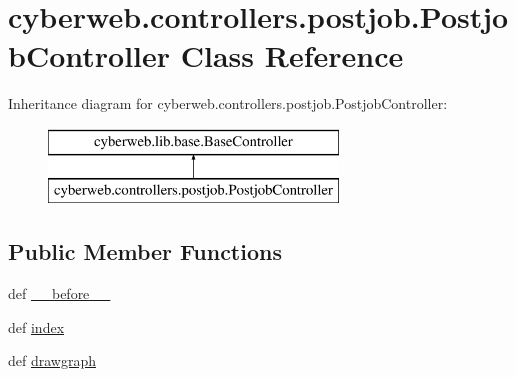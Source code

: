 \hypertarget{classcyberweb_1_1controllers_1_1postjob_1_1_postjob_controller}{\section{cyberweb.\-controllers.\-postjob.\-Postjob\-Controller \-Class \-Reference}
\label{classcyberweb_1_1controllers_1_1postjob_1_1_postjob_controller}
}
\-Inheritance diagram for cyberweb.\-controllers.\-postjob.\-Postjob\-Controller\-:\begin{figure}[H]
\begin{center}
\leavevmode
\includegraphics[height=2.000000cm]{classcyberweb_1_1controllers_1_1postjob_1_1_postjob_controller}
\end{center}
\end{figure}
\subsection*{\-Public \-Member \-Functions}
\begin{DoxyCompactItemize}
\item 
def \hyperlink{classcyberweb_1_1controllers_1_1postjob_1_1_postjob_controller_ab280ec1fda86886413f15800bc757799}{\-\_\-\-\_\-before\-\_\-\-\_\-}
\item 
def \hyperlink{classcyberweb_1_1controllers_1_1postjob_1_1_postjob_controller_a82ed8ba6ad913491e35b88b6d3e0f9b9}{index}
\item 
def \hyperlink{classcyberweb_1_1controllers_1_1postjob_1_1_postjob_controller_a179144c15c68178fca3412270c8524e8}{drawgraph}
\end{DoxyCompactItemize}


